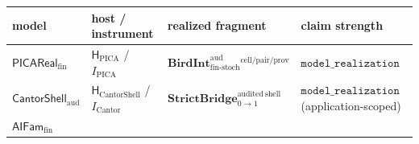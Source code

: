 \documentclass[11pt]{article}
\theoremstyle{definition}
\begin{document}
\begin{longtable}[]{@{}llll@{}}
\toprule
\begin{minipage}[b]{0.14\columnwidth}\raggedright
model\strut
\end{minipage} & \begin{minipage}[b]{0.22\columnwidth}\raggedright
host / instrument\strut
\end{minipage} & \begin{minipage}[b]{0.42\columnwidth}\raggedright
realized fragment\strut
\end{minipage} & \begin{minipage}[b]{0.11\columnwidth}\raggedright
claim strength\strut
\end{minipage}\tabularnewline
\midrule
\endhead
\begin{minipage}[t]{0.14\columnwidth}\raggedright
\(\mathsf{PICAReal}_{\mathrm{fin}}\)\strut
\end{minipage} & \begin{minipage}[t]{0.22\columnwidth}\raggedright
\(\mathsf H_{\mathrm{PICA}}\) / \(I_{\mathrm{PICA}}\)\strut
\end{minipage} & \begin{minipage}[t]{0.42\columnwidth}\raggedright
\(\mathbf{BirdInt}^{\mathrm{aud}}_{\mathrm{fin\text{-}stoch}}{}^{\mathrm{cell}/\mathrm{pair}/\mathrm{prov}}\)\strut
\end{minipage} & \begin{minipage}[t]{0.11\columnwidth}\raggedright
\(\texttt{model\_realization}\)\strut
\end{minipage}\tabularnewline
\begin{minipage}[t]{0.14\columnwidth}\raggedright
\(\mathsf{CantorShell}_{\mathrm{aud}}\)\strut
\end{minipage} & \begin{minipage}[t]{0.22\columnwidth}\raggedright
\(\mathsf H_{\mathrm{CantorShell}}\) / \(I_{\mathrm{Cantor}}\)\strut
\end{minipage} & \begin{minipage}[t]{0.42\columnwidth}\raggedright
\(\mathbf{StrictBridge}_{0\to 1}^{\mathrm{audited\ shell}}\)\strut
\end{minipage} & \begin{minipage}[t]{0.11\columnwidth}\raggedright
\(\texttt{model\_realization}\) (application-scoped)\strut
\end{minipage}\tabularnewline
\begin{minipage}[t]{0.14\columnwidth}\raggedright
\(\mathsf{AIFam}_{\mathrm{fin}}\)\strut

\end{minipage}
\end{longtable}
\end{document}
